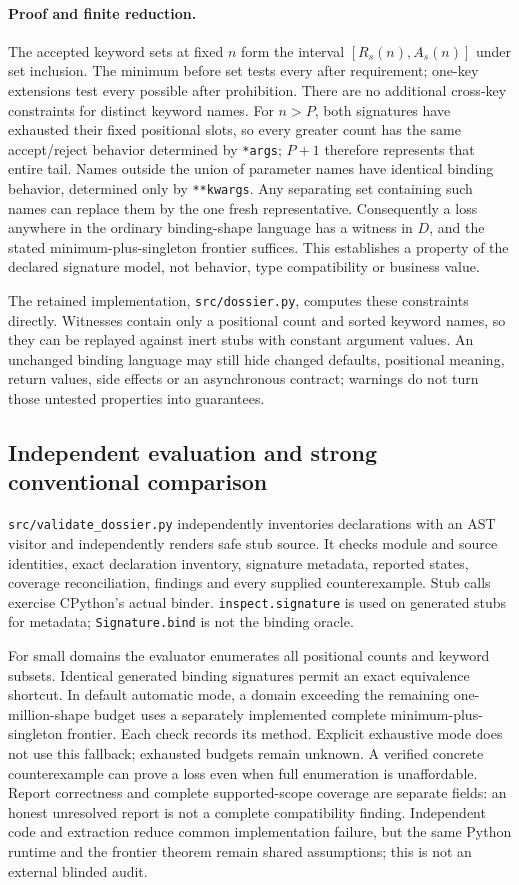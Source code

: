 \paragraph{Proof and finite reduction.}
The accepted keyword sets at fixed $n$ form the interval
$[R_s(n),A_s(n)]$ under set inclusion. The minimum before set tests every
after requirement; one-key extensions test every possible after prohibition.
There are no additional cross-key constraints for distinct keyword names.
For $n>P$, both signatures have exhausted their fixed positional slots, so
every greater count has the same accept/reject behavior determined by
\texttt{*args}; $P+1$ therefore represents that entire tail. Names outside
the union of parameter names have identical binding behavior, determined
only by \texttt{**kwargs}. Any separating set containing such names can
replace them by the one fresh representative. Consequently a loss anywhere
in the ordinary binding-shape language has a witness in $D$, and the stated
minimum-plus-singleton frontier suffices. This establishes a property of the
declared signature model, not behavior, type compatibility or business value.

The retained implementation, \texttt{src/dossier.py}, computes these
constraints directly. Witnesses contain only a positional count and sorted
keyword names, so they can be replayed against inert stubs with constant
argument values. An unchanged binding language may still hide changed
defaults, positional meaning, return values, side effects or an asynchronous
contract; warnings do not turn those untested properties into guarantees.

\subsection{Independent evaluation and strong conventional comparison}

\texttt{src/validate\_dossier.py} independently inventories declarations with
an AST visitor and independently renders safe stub source. It checks module
and source identities, exact declaration inventory, signature metadata,
reported states, coverage reconciliation, findings and every supplied
counterexample. Stub calls exercise CPython's actual binder.
\texttt{inspect.signature} is used on generated stubs for metadata;
\texttt{Signature.bind} is not the binding oracle.

For small domains the evaluator enumerates all positional counts and
keyword subsets. Identical generated binding signatures permit an exact
equivalence shortcut. In default automatic mode, a domain exceeding the
remaining one-million-shape budget uses a separately implemented complete
minimum-plus-singleton frontier. Each check records its method. Explicit
exhaustive mode does not use this fallback; exhausted budgets remain unknown.
A verified concrete counterexample can prove a loss even when full
enumeration is unaffordable. Report correctness and complete supported-scope
coverage are separate fields: an honest unresolved report is not a complete
compatibility finding. Independent code and extraction reduce common
implementation failure, but the same Python runtime and the frontier
theorem remain shared assumptions; this is not an external blinded audit.

